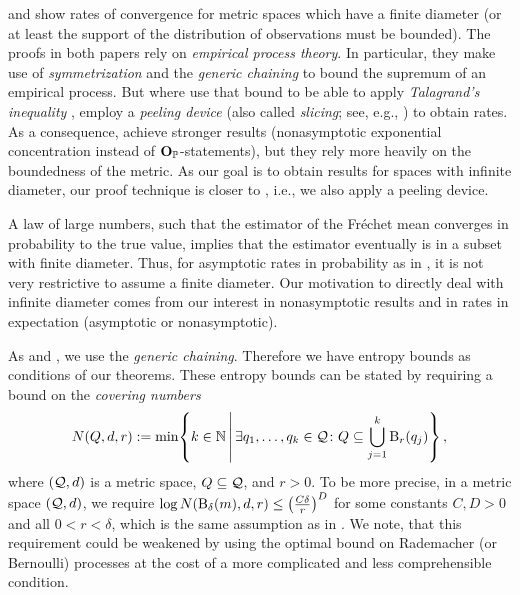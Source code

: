 \cite{petersen16} and \cite{legouic18} show rates of convergence for metric spaces which have a finite diameter (or at least the support of the distribution of observations must be bounded). The proofs in both papers rely on \textit{empirical process theory}. In particular, they make use of \textit{symmetrization} and the \textit{generic chaining} to bound the supremum of an empirical process. But where \cite{legouic18} use that bound to be able to apply \textit{Talagrand's inequality} \cite{bousquet02}, \cite{petersen16} employ a \textit{peeling device} (also called \textit{slicing}; see, e.g., \cite{geer00}) to obtain rates. 
As a consequence, \cite{legouic18} achieve stronger results (nonasymptotic exponential concentration instead of $\mathbf{O}_{\mathbb{P}}$-statements), but they rely more heavily on the boundedness of the metric.
As our goal is to obtain results for spaces with infinite diameter, our proof technique is closer to \cite{petersen16}, i.e., we also apply a peeling device.

A law of large numbers, such that the estimator of the Fréchet mean converges in probability to the true value, implies that the estimator eventually is in a subset with finite diameter. Thus, for asymptotic rates in probability as in \cite{petersen16}, it is not very restrictive to assume a finite diameter. Our motivation to directly deal with infinite diameter comes from our interest in nonasymptotic results and in rates in expectation (asymptotic or nonasymptotic).

As \cite{petersen16} and \cite{legouic18}, we use the \textit{generic chaining}. Therefore we have entropy bounds as conditions of our theorems. These entropy bounds can be stated by requiring a bound on the \textit{covering numbers} 
\begin{equation*}
	N(Q, d, r) := \min\mathopen{}\left\lbrace k \in \mathbb{N} \,\middle|\, \exists q_1,\dots,q_k\in\mathcal{Q}\colon Q\subseteq \bigcup_{j=1}^k \operatorname{\mathrm{B}}_r(q_j)  \right\rbrace\mathclose{}\, ,
\end{equation*}
where $(\mathcal{Q}, d)$ is a metric space, $Q \subseteq \mathcal{Q}$, and $r > 0$.
To be more precise, in a metric space $(\mathcal{Q}, d)$, we require $\log N(\operatorname{\mathrm{B}}_\delta(m), d, r) \leq \left( \frac{C\delta}{r} \right)^D$ for some constants $C,D >0$ and all $0 < r < \delta$, which is the same assumption as in \cite{legouic18}.
We note, that this requirement could be weakened by using the optimal bound on Rademacher (or Bernoulli) processes \cite{bednorz14} at the cost of a more complicated and less comprehensible condition.

